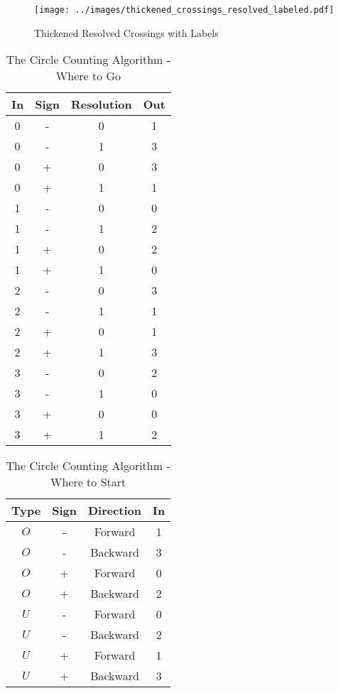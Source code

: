 \documentclass{article}
\theoremstyle{plain}
\begin{document}
        \begin{figure}
            \centering
            \texttt{[image: ../images/thickened\_crossings\_resolved\_labeled.pdf]}
            \caption{Thickened Resolved Crossings with Labels}
            \label{fig:thickened_crossings_resolved_labeled}
        \end{figure}
        \begin{table}
            \centering
            \begin{tabular}{c c c c}
                In&Sign&Resolution&Out\\
                \hline
                0&-&0&1\\
                0&-&1&3\\
                0&+&0&3\\
                0&+&1&1\\
                \hline
                1&-&0&0\\
                1&-&1&2\\
                1&+&0&2\\
                1&+&1&0\\
                \hline
                2&-&0&3\\
                2&-&1&1\\
                2&+&0&1\\
                2&+&1&3\\
                \hline
                3&-&0&2\\
                3&-&1&0\\
                3&+&0&0\\
                3&+&1&2
            \end{tabular}
            \caption{The Circle Counting Algorithm - Where to Go}
            \label{tab:circle_counting_algorithm_where_go}
        \end{table}
        \begin{table}
            \centering
            \begin{tabular}{c c c c}
                Type&Sign&Direction&In\\
                \hline
                $O$&-&Forward&1\\
                $O$&-&Backward&3\\
                $O$&+&Forward&0\\
                $O$&+&Backward&2\\
                \hline
                $U$&-&Forward&0\\
                $U$&-&Backward&2\\
                $U$&+&Forward&1\\
                $U$&+&Backward&3
            \end{tabular}
            \caption{The Circle Counting Algorithm - Where to Start}
            \label{tab:circle_counting_algorithm_where_start}
        \end{table}
\end{document}
